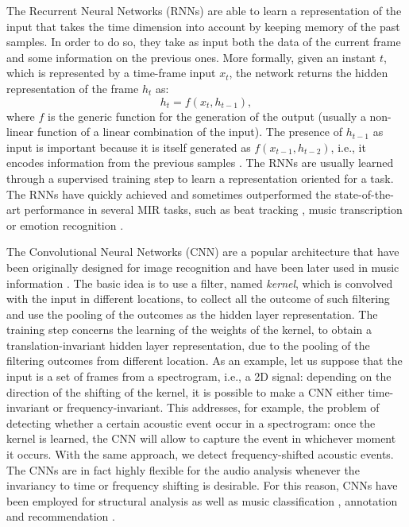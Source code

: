 The Recurrent Neural Networks (RNNs) are able to learn a representation of the input that takes the time dimension into account by keeping memory of the past samples. In order to do so, they take as input both the data of the current frame and some information on the previous ones. More formally, given an instant $t$, which is represented by a time-frame input $x_t$, the network returns the hidden representation of the frame $h_t$ as:
\begin{equation}
h_t=f(x_t, h_{t-1}),
\end{equation}
where $f$ is the generic function for the generation of the output (usually a non-linear function of a linear combination of the input). The presence of $h_{t-1}$ as input is important because it is itself generated as $f(x_{t-1}, h_{t-2})$, i.e., it encodes information from the previous samples \cite{mesnil2013investigation}. The RNNs are usually learned through a supervised training step to learn a representation oriented for a task. The RNNs have quickly achieved and sometimes outperformed the state-of-the-art performance in several MIR tasks, such as beat tracking \cite{bock2014multi}, music transcription \cite{sigtia2016end} or emotion recognition \cite{Weninger2014}.

The Convolutional Neural Networks (CNN) are a popular architecture that have been originally designed for image recognition and have been later used in music information \cite{lee2009convolutional}. The basic idea is to use a filter, named \textit{kernel}, which is convolved with the input in different locations, to collect all the outcome of such filtering and use the pooling of the outcomes as the hidden layer representation. The training step concerns the learning of the weights of the kernel, to obtain a translation-invariant hidden layer representation, due to the pooling of the filtering outcomes from different location. As an example, let us suppose that the input is a set of frames from a spectrogram, i.e., a 2D signal: depending on the direction of the shifting of the kernel, it is possible to make a CNN either time-invariant or frequency-invariant. This addresses, for example, the problem of detecting whether a certain acoustic event occur in a spectrogram: once the kernel is learned, the CNN will allow to capture the event in whichever moment it occurs. With the same approach, we detect frequency-shifted acoustic events. The CNNs are in fact highly flexible for the audio analysis whenever the invariancy to time or frequency shifting is desirable. For this reason, CNNs have been employed for structural analysis \cite{ullrich2014boundary} as well as music classification \cite{dieleman2011audio}, annotation \cite{dieleman2014end} and recommendation \cite{van2013deep}.

